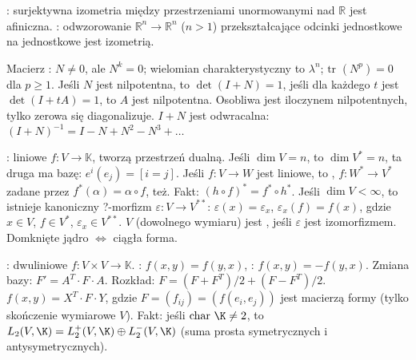 : surjektywna izometria między przestrzeniami unormowanymi nad $\mathbb R$ jest afiniczna.
: odwzorowanie $\mathbb R^n \to \mathbb R^n$ ($n > 1$) przekształcające odcinki jednostkowe na jednostkowe jest izometrią.


Macierz : $N \neq 0$, ale $N^k = 0$; wielomian charakterystyczny to $\lambda^n$;  $\text{tr }(N^p) = 0$ dla $p \ge 1$.
Jeśli $N$ jest nilpotentna, to $\det (I+N) = 1$, jeśli dla każdego $t$ jest  $\det(I+tA) = 1$, to $A$ jest nilpotentna.
Osobliwa jest iloczynem nilpotentnych, tylko zerowa się diagonalizuje.
$I+N$ jest odwracalna: $(I+N)^{-1} = I - N + N^2 - N^3 + \dots$

: liniowe $f: V \to \mathbb K$, tworzą przestrzeń dualną.
Jeśli $\dim V = n$, to $\dim V^* = n$, ta druga ma bazę: $e^i(e_j) = [i = j]$.
Jeśli $f:V\to W$ jest liniowe, to , $f:W^* \to V^*$ zadane przez $f^*(\alpha) = \alpha \circ f$, też.
Fakt: $(h \circ f)^* = f^* \circ h^*$.
Jeśli $\dim V < \infty$, to istnieje kanoniczny ?-morfizm $\varepsilon: V \to V^{**}$: $\varepsilon(x) = \varepsilon_x$, $\varepsilon_x(f) = f(x)$, gdzie $x \in V$, $f \in V^*$, $\varepsilon_x \in V^{**}$.
$V$ (dowolnego wymiaru) jest , jeśli $\varepsilon$ jest izomorfizmem. 
Domknięte jądro $\Leftrightarrow$ ciągła forma.

: dwuliniowe $f\colon V \times V \to \mathbb K$.
: $f(x,y) = f(y,x)$, : $f(x,y) = - f(y,x)$.
Zmiana bazy: $F' = A^T \cdot F \cdot A$.
Rozkład: $F = (F+ F^T)/2 + (F-F^T)/2$.
$f(x, y) = X^T \cdot F \cdot Y$, gdzie $F = (f_{ij}) = (f(e_i, e_j))$ jest macierzą formy (tylko skończenie wymiarowe $V$).
Fakt: jeśli $\text{char } \K \neq 2$, to $L_2(V, \K) = L_2^+(V, \K) \oplus L_2^-(V, \K)$ (suma prosta symetrycznych i antysymetrycznych).



